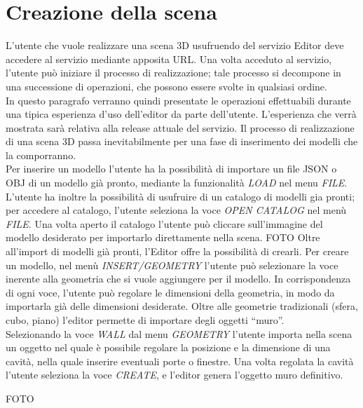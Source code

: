 \section{Creazione della scena}
\label{sec:chapter_caso_uso_creazione_scena}

L’utente che vuole realizzare una scena 3D usufruendo del servizio Editor deve accedere al servizio mediante apposita URL.
Una volta acceduto al servizio, l’utente può iniziare il processo di realizzazione; tale processo si decompone in una successione di operazioni, che possono essere svolte in qualsiasi ordine.
\\
In questo paragrafo verranno quindi presentate le operazioni effettuabili durante una tipica esperienza d’uso dell’editor da parte dell’utente. 
L’esperienza che verrà mostrata sarà relativa alla release attuale del servizio.
Il processo di realizzazione di una scena 3D passa inevitabilmente per una fase di inserimento dei modelli che la comporranno. 
\\
Per inserire un modello l’utente ha la possibilità di importare un file JSON o OBJ di un modello già pronto, mediante la funzionalità \emph{LOAD} nel menu \emph{FILE}. 
L’utente ha inoltre la possibilità di usufruire di un catalogo di modelli gia pronti; per accedere al catalogo, l’utente seleziona la voce \emph{OPEN CATALOG} nel menù \emph{FILE}. Una volta aperto il catalogo l’utente può cliccare sull’immagine del modello desiderato per importarlo direttamente nella scena. 
FOTO
Oltre all’import di modelli già pronti, l’Editor offre la possibilità di crearli. Per creare un modello, nel menù \emph{INSERT/GEOMETRY} l’utente può selezionare la voce inerente alla geometria che si vuole aggiungere per il modello. In corrispondenza di ogni voce, l’utente può regolare le dimensioni della geometria, in modo da importarla già delle dimensioni desiderate.
Oltre alle geometrie tradizionali (sfera, cubo, piano) l’editor permette di importare degli oggetti “muro”.
\\
Selezionando la voce \emph{WALL} dal menu \emph{GEOMETRY} l’utente importa nella scena un oggetto nel quale è possibile regolare la posizione e la dimensione di una cavità, nella quale inserire eventuali porte o finestre. Una volta regolata la cavità l’utente seleziona la voce \emph{CREATE}, e l’editor genera l’oggetto muro definitivo.


FOTO


